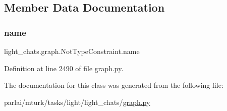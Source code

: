 \subsection{Member Data Documentation}
\mbox{\label{classlight__chats_1_1graph_1_1NotTypeConstraint_ad6119b9dbdfc0d1049e91e3f46832601}} 
\subsubsection{\texorpdfstring{name}{name}}
{\footnotesize\ttfamily light\+\_\+chats.\+graph.\+Not\+Type\+Constraint.\+name\hspace{0.3cm}{\ttfamily [static]}}



Definition at line 2490 of file graph.\+py.



The documentation for this class was generated from the following file\+:\begin{DoxyCompactItemize}
\item 
parlai/mturk/tasks/light/light\+\_\+chats/\hyperlink{parlai_2mturk_2tasks_2light_2light__chats_2graph_8py}{graph.\+py}\end{DoxyCompactItemize}

